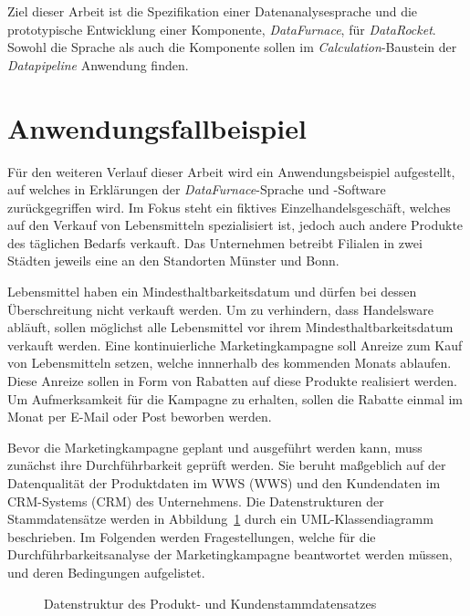 \documentclass[
  language=german, %
  type=bachelor,%
  ngerman
]{isthesis}
\begin{document}
\begin{content}
	Ziel dieser Arbeit ist die Spezifikation einer Datenanalysesprache und die
	prototypische Entwicklung einer Komponente, \textit{DataFurnace}, für
	\textit{DataRocket}. Sowohl die Sprache als auch die Komponente sollen im
	\textit{Calculation}-Baustein der \textit{Datapipeline} Anwendung finden.

  \section{Anwendungsfallbeispiel}\label{sec:anwendungsfallbeispiel}

  Für den weiteren Verlauf dieser Arbeit wird ein Anwendungsbeispiel
  aufgestellt, auf welches in Erklärungen der \textit{DataFurnace}-Sprache und
  -Software zurückgegriffen wird. Im Fokus steht ein fiktives
  Einzelhandelsgeschäft, welches auf den Verkauf von Lebensmitteln
  spezialisiert ist, jedoch auch andere Produkte des täglichen Bedarfs
  verkauft. Das Unternehmen betreibt Filialen in zwei Städten jeweils eine an
  den Standorten Münster und Bonn.

  Lebensmittel haben ein Mindesthaltbarkeitsdatum und dürfen bei dessen
  Überschreitung nicht verkauft werden. Um zu verhindern, dass Handelsware
  abläuft, sollen möglichst alle Lebensmittel vor ihrem
  Mindesthaltbarkeitsdatum verkauft werden. Eine kontinuierliche
  Marketingkampagne soll Anreize zum Kauf von Lebensmitteln setzen, welche
  innnerhalb des kommenden Monats ablaufen. Diese Anreize sollen in Form von
  Rabatten auf diese Produkte realisiert werden. Um Aufmerksamkeit für die
  Kampagne zu erhalten, sollen die Rabatte einmal im Monat per E-Mail oder Post
  beworben werden. 

  Bevor die Marketingkampagne geplant und ausgeführt werden kann, muss zunächst
  ihre Durchführbarkeit geprüft werden. Sie beruht maßgeblich auf der
  Datenqualität der Produktdaten im \acrlong{WWS} (\acrshort{WWS}) und den
  Kundendaten im \acrlong{CRM}-Systems (\acrshort{CRM}) des Unternehmens. Die
  Datenstrukturen der Stammdatensätze werden in
  Abbildung~\ref{example-use-case-data} durch ein UML-Klassendiagramm
  beschrieben. Im Folgenden werden Fragestellungen, welche für die
  Durchführbarkeitsanalyse der Marketingkampagne beantwortet werden müssen, und
  deren Bedingungen aufgelistet.

  \begin{figure}
    \resizebox{250pt}{!}{}
    \caption{Datenstruktur des Produkt- und Kundenstammdatensatzes}\label{example-use-case-data}
  \end{figure}


\end{content}
\end{document}

